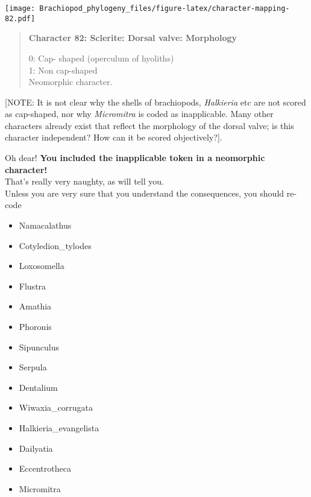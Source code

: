 \documentclass[openany]{book}
\providecommand{\tightlist}{%
  \setlength{\itemsep}{0pt}\setlength{\parskip}{0pt}}
\theoremstyle{definition}
\theoremstyle{definition}
\theoremstyle{definition}
\theoremstyle{remark}
\begin{document}
\texttt{[image: Brachiopod\_phylogeny\_files/figure-latex/character-mapping-82.pdf]}

\begin{quote}
\textbf{Character 82: Sclerite: Dorsal valve: Morphology}

0: Cap- shaped (operculum of hyoliths)\\
1: Non cap-shaped\\
Neomorphic character.
\end{quote}

{[}NOTE: It is not clear why the shells of brachiopods, \emph{Halkieria}
etc are not scored as cap-shaped, nor why \emph{Micromitra} is coded as
inapplicable. Many other characters already exist that reflect the
morphology of the dorsal valve; is this character independent? How can
it be scored objectively?{]}.

Oh dear! \textbf{You included the inapplicable token in a neomorphic
character!}\\
That's really very naughty, as \citet{Brazeau2018} will tell you.\\
Unless you are very sure that you understand the consequences, you
should re-code

\begin{itemize}
\tightlist
\item
  Namacalathus\\
\item
  Cotyledion\_tylodes\\
\item
  Loxosomella\\
\item
  Flustra\\
\item
  Amathia\\
\item
  Phoronis\\
\item
  Sipunculus\\
\item
  Serpula\\
\item
  Dentalium\\
\item
  Wiwaxia\_corrugata\\
\item
  Halkieria\_evangelista\\
\item
  Dailyatia\\
\item
  Eccentrotheca\\
\item
  Micromitra
\end{itemize}
\end{document}
